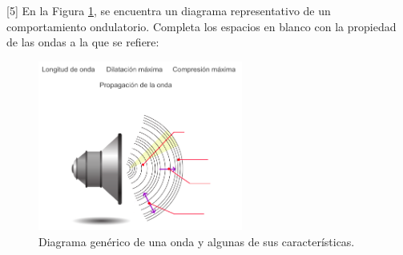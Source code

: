 [5] En la Figura \ref{fig:onda_sonido}, se encuentra un diagrama representativo de un comportamiento ondulatorio. Completa los espacios en blanco con la propiedad de las ondas a la que se refiere:
\begin{figure}[H]
    \centering
    \includegraphics[width =0.6\textwidth ]{Images/onda_sonido.png}
    \caption{Diagrama gen\'erico de una onda y algunas de sus caracter\'isticas.}
    \label{fig:onda_sonido}
\end{figure}